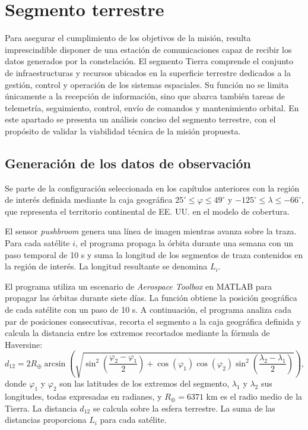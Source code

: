 \chapter{Segmento terrestre} \label{ch:tierra}
\minitoc

Para asegurar el cumplimiento de los objetivos de la misión, resulta imprescindible disponer de una estación de comunicaciones capaz de recibir los datos generados por la constelación. El segmento Tierra comprende el conjunto de infraestructuras y recursos ubicados en la superficie terrestre dedicados a la gestión, control y operación de los sistemas espaciales. Su función no se limita únicamente a la recepción de información, sino que abarca también tareas de telemetría, seguimiento, control, envío de comandos y mantenimiento orbital. En este apartado se presenta un análisis conciso del segmento terrestre, con el propósito de validar la viabilidad técnica de la misión propuesta.
\newpage
\section{Generación de los datos de observación}

Se parte de la configuración seleccionada en los capítulos anteriores con la región de interés definida mediante la caja geográfica \(25^\circ\leq\varphi\leq49^\circ\) y \(-125^\circ\leq\lambda\leq-66^\circ\), que representa el territorio continental de EE. UU. en el modelo de cobertura.

El sensor \textit{pushbroom} genera una línea de imagen mientras avanza sobre la traza. Para cada satélite \(i\), el programa propaga la órbita durante una semana con un paso temporal de 10 s y suma la longitud de los segmentos de traza contenidos en la región de interés. La longitud resultante se denomina \(L_i\).

El programa utiliza un escenario de \textit{Aerospace Toolbox} en MATLAB para propagar las órbitas durante siete días. La función obtiene la posición geográfica de cada satélite con un paso de 10 s. A continuación, el programa analiza cada par de posiciones consecutivas, recorta el segmento a la caja geográfica definida y calcula la distancia entre los extremos recortados mediante la fórmula de Haversine:
\begin{equation}
d_{12}=2R_{\oplus}\arcsin\left(
\sqrt{
\sin^2\left(\frac{\varphi_2-\varphi_1}{2}\right)
+\cos(\varphi_1)\cos(\varphi_2)
\sin^2\left(\frac{\lambda_2-\lambda_1}{2}\right)
}
\right),
\label{eq:haversine}
\end{equation}
donde \(\varphi_1\) y \(\varphi_2\) son las latitudes de los extremos del segmento, \(\lambda_1\) y \(\lambda_2\) sus longitudes, todas expresadas en radianes, y \(R_{\oplus}=6371\) km es el radio medio de la Tierra. La distancia \(d_{12}\) se calcula sobre la esfera terrestre. La suma de las distancias proporciona \(L_i\) para cada satélite.

